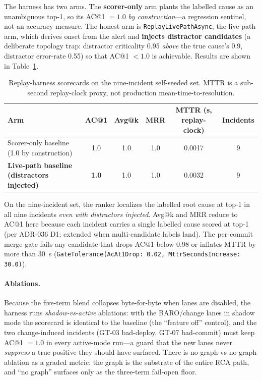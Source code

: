 \documentclass[11pt]{article}
\begin{document}
The harness has two arms. The \textbf{scorer-only} arm plants the labelled cause
as an unambiguous top-1, so its AC@1 $= 1.0$ \emph{by construction}---a regression
sentinel, not an accuracy measure. The honest arm is \texttt{ReplayLivePathAsync},
the live-path arm, which derives onset from the alert and \textbf{injects
distractor candidates} (a deliberate topology trap: distractor criticality 0.95
\emph{above} the true cause's 0.9, distractor error-rate 0.55) so that AC@1
$< 1.0$ is achievable. Results are shown in Table~\ref{tab:scorecard}.

\begin{table}[ht]
\centering
\caption{Replay-harness scorecards on the nine-incident self-seeded set. MTTR is a
sub-second replay-clock proxy, not production mean-time-to-resolution.}
\label{tab:scorecard}
\begin{tabular}{lccccc}
\toprule
Arm & AC@1 & Avg@k & MRR & MTTR (s, replay-clock) & Incidents \\
\midrule
Scorer-only baseline (1.0 by construction) & 1.0 & 1.0 & 1.0 & 0.0017 & 9 \\
\textbf{Live-path baseline (distractors injected)} & \textbf{1.0} & 1.0 & 1.0 & 0.0032 & 9 \\
\bottomrule
\end{tabular}
\end{table}

On the nine-incident set, the ranker localizes the labelled root cause at top-1 in
all nine incidents \emph{even with distractors injected}. Avg@k and MRR reduce to
AC@1 here because each incident carries a single labelled cause scored at top-1
(per ADR-036 D1; extended when multi-candidate labels land). The per-commit merge
gate fails any candidate that drops AC@1 below 0.98 or inflates MTTR by more than
30~s (\texttt{GateTolerance(AcAt1Drop: 0.02, MttrSecondsIncrease: 30.0)}).

\paragraph{Ablations.}
Because the five-term blend collapses byte-for-byte when lanes are disabled, the
harness runs \emph{shadow-vs-active} ablations: with the BARO/change lanes in
shadow mode the scorecard is identical to the baseline (the ``feature off''
control), and the two change-induced incidents (GT-03 bad-deploy, GT-07
bad-commit) must keep AC@1 $= 1.0$ in every active-mode run---a guard that the new
lanes never \emph{suppress} a true positive they should have surfaced. There is no
graph-vs-no-graph ablation as a graded metric: the graph is the substrate of the
entire RCA path, and ``no graph'' surfaces only as the three-term fail-open floor.
\end{document}
